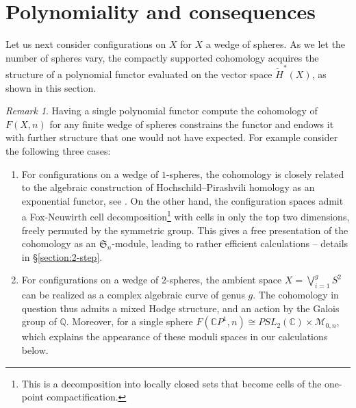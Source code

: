 \documentclass[12pt]{article}
\newcommand{\C}{\mathbb{C}}
\newcommand{\Q}{\mathbb{Q}}
\newcommand{\SymGroup}[1][n]{\mathfrak{S}_{#1}}
\newcommand{\ModuliCurve}[1]{\mathcal{M}_{#1}}
\theoremstyle{plain}
\theoremstyle{definition}
\theoremstyle{remark}
\newtheorem{rmk}[thm]{Remark}
\begin{document}
\section{Polynomiality and consequences} \label{sec:polynomiality}


Let us next consider configurations on $X$  for $X$ a wedge of spheres. As we let the number of spheres vary, the compactly supported cohomology acquires the structure of a polynomial functor evaluated on the vector space $\tilde{H}^*(X)$, as shown in this section.%

\begin{rmk}\label{rmk:using geometry}
Having a single polynomial functor compute the cohomology of $F(X,n)$ for any finite wedge of spheres constrains the functor and endows it with further structure that one would not have expected. For example consider the following three cases:
\begin{enumerate}
\item For configurations on a wedge of $1$-spheres, the cohomology is closely related to the algebraic construction of Hochschild--Pirashvili homology as an exponential functor, see \cite{PV18}. On the other hand, the configuration spaces admit a Fox-Neuwirth cell decomposition\footnote{This is a decomposition into locally closed sets that become cells of the one-point compactification.} with cells in only the top two dimensions, freely permuted by the symmetric group. This gives a free presentation of the cohomology as an $\SymGroup$-module, leading to rather efficient calculations -- details in \S\ref{section:2-step}.


    \item For configurations on a wedge of $2$-spheres, the ambient space $X= \bigvee_{i=1}^g S^2$ can be realized as a complex algebraic curve of genus $g$. The cohomology in question thus admits a mixed Hodge structure, and an action by the Galois group of $\Q$.
    Moreover, for a single sphere $F(\mathbb{C}P^1,n) \cong PSL_2(\C)\times \ModuliCurve{0,n}$, which explains the appearance of these moduli spaces in our calculations below.
    

\end{enumerate}
\end{rmk}
\end{document}
